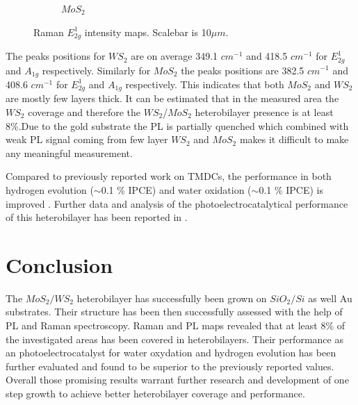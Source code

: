 \begin{figure}[H]
\begin{center}
\begin{subfigure}[b]{0.45\textwidth}
			\caption{$MoS_2$}
			\label{fig:HeterostructuresRamanIntensityEMoAu}
		\end{subfigure}
		\caption{Raman $E^1_{2g}$ intensity maps. Scalebar is 10$\mu m$.}
		\label{fig:HeterostructuresRamanIntensityEMaps}
	\end{center}
\end{figure}

The peaks positions for $WS_2$ are on average 349.1 $cm^{-1}$ and 418.5 $cm^{-1}$ for $E^1_{2g}$ and $A_{1g}$ respectively. Similarly for $MoS_2$ the peaks positions are 382.5 $cm^{-1}$ and 408.6 $cm^{-1}$ for $E^1_{2g}$ and $A_{1g}$ respectively. This indicates that both $MoS_2$ and $WS_2$ are mostly few layers thick. It can be estimated that in the measured area the $WS_2$ coverage and therefore the $WS_2$/$MoS_2$ heterobilayer presence is at least 8{\%}.Due to the gold substrate the PL is partially quenched which combined with weak PL signal coming from few layer $WS_2$ and $MoS_2$ makes it difficult to make any meaningful measurement.

Compared to previously reported work on TMDCs, the performance in both hydrogen evolution ($\sim$0.1 \% IPCE) and water oxidation ($\sim$0.1 \% IPCE) is improved \cite{Fu2015}. Further data and analysis of the photoelectrocatalytical performance of this heterobilayer has been reported in \cite{Sherrell2019}.

\section{Conclusion}

The $MoS_2/WS_2$ heterobilayer has successfully been grown on $SiO_2/Si$ as well Au substrates. Their structure has been then successfully assessed with the help of PL and Raman spectroscopy. Raman and PL maps revealed that at least 8\% of the investigated areas has been covered in heterobilayers. Their performance as an photoelectrocatalyst for water oxydation and hydrogen evolution has been further evaluated and found to be superior to the previously reported values. Overall those promising results warrant further research and development of one step growth to achieve better heterobilayer coverage and performance.